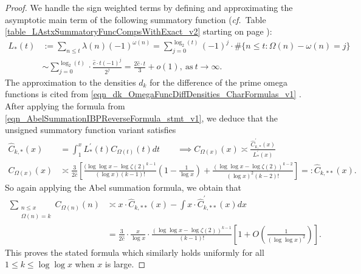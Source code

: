 \documentclass[11pt,reqno,a4letter]{article}
\numberwithin{figure}{section}
\numberwithin{table}{section}
\newcommand{\cf}{\textit{cf.\ }}
\theoremstyle{plain}
\numberwithin{theorem}{section}
\theoremstyle{definition}
\begin{document}
\begin{proof}
We handle the sign weighted terms by defining and approximating the asymptotic main term 
of the following summatory function 
(\cf Table \ref{table_LAstxSummatoryFuncCompsWithExact_v2} starting on page 
\pageref{table_LAstxSummatoryFuncCompsWithExact_v2}): 
\begin{align*} 
L_{\ast}(t) & := \sum_{n \leq t} \lambda(n) (-1)^{\omega(n)} = 
     \sum_{j=0}^{\log_2(t)} (-1)^{j} \cdot \#\{n \leq t: \Omega(n) - \omega(n) = j\} \\ 
     & \sim \sum_{j=0}^{\log_2(t)} \cdot \frac{\hat{c} \cdot t (-1)^{j}}{2^j} = 
     \frac{2\hat{c} \cdot t}{3} + o(1), \mathrm{\ as\ } t \rightarrow \infty. 
\end{align*} 
The approximation to the densities $d_k$ for the difference of the prime omega 
functions is cited from 
\eqref{eqn_dk_OmegaFuncDiffDensities_CharFormulas_v1} \cite[\S 2.4]{MV}. 
After applying the formula from \eqref{eqn_AbelSummationIBPReverseFormula_stmt_v1},  
we deduce that the unsigned summatory function variant satisfies 
\begin{align*} 
\widehat{C}_{k,\ast}(x) & = \int_1^{x} L_{\ast}^{\prime}(t) C_{\Omega(t)}(t) dt \qquad \implies 
C_{\Omega(x)}(x) \asymp \frac{\widehat{C}_{k,\ast}^{\prime}(x)}{L_{\ast}^{\prime}(x)} \\ 
C_{\Omega(x)}(x) & \asymp \frac{3}{2\hat{c}} \left[\frac{(\log\log x - \log\zeta(2)^{k-1}}{(\log x) (k-1)!} \left(1 - 
     \frac{1}{\log x}\right) + \frac{(\log\log x - \log\zeta(2))^{k-2}}{(\log x)^2 (k-2)!}\right] 
     =: \widehat{C}_{k,\ast\ast}(x). 
\end{align*} 
So again applying the Abel summation formula, we obtain that 
\begin{align*} 
\sum_{\substack{n \leq x \\ \Omega(n)=k}} C_{\Omega(n)}(n) & \asymp 
     x \cdot \widehat{C}_{k,\ast\ast}(x) - 
     \int x \cdot \widehat{C}^{\prime}_{k,\ast\ast}(x) dx \\ 
     & = \frac{3}{2\hat{c}} \cdot \frac{x}{\log x} \cdot 
     \frac{(\log\log x - \log\zeta(2))^{k-1}}{(k-1)!} \left[1 + O\left(\frac{1}{(\log\log x)^2}\right) 
     \right]. 
\end{align*} 
This proves the stated formula which similarly holds uniformly for all $1 \leq k \leq \log\log x$ 
when $x$ is large. 
\end{proof}
\end{document}
